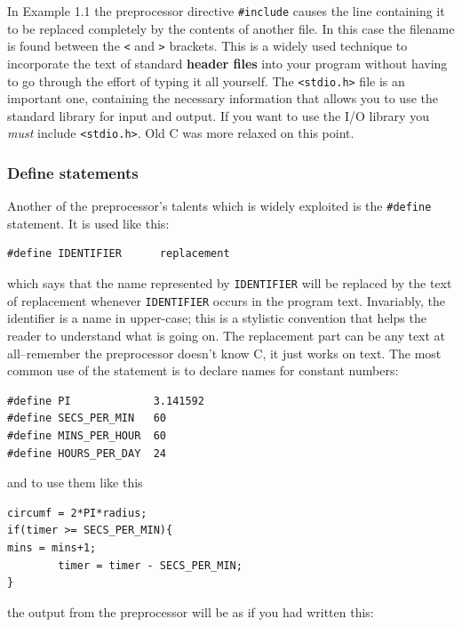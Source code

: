    In Example 1.1 the preprocessor directive
    \texttt{\#include} causes the line containing it to be replaced
    completely by the contents of another file. In this case the filename is
    found between the \texttt{<} and \texttt{>} brackets. This is
    a widely used technique to incorporate the text of standard \textbf{header
    files} into your program without having to go through the effort of
    typing it all yourself. The \texttt{<stdio.h>} file is an
    important one, containing the necessary information that allows you to use
    the standard library for input and output.  If you want to use the I/O
    library you \textit{must} include \texttt{<stdio.h>}. Old C was
    more relaxed on this point.


   \subsubsection{Define statements}
    

    Another of the preprocessor's talents which is widely exploited is the
     \texttt{\#define} statement. It is used like this:


    \begin{Verbatim}
#define IDENTIFIER      replacement
\end{Verbatim}

    which says that the name represented by \texttt{IDENTIFIER} will be
     replaced by the text of replacement whenever \texttt{IDENTIFIER}
     occurs in the program text. Invariably, the identifier is a name in
     upper-case; this is a stylistic convention that helps the reader to
     understand what is going on.  The replacement part can be any text at
     all--remember the preprocessor doesn't know C, it just works on
     text. The most common use of the statement is to declare names for
     constant numbers:


    \begin{Verbatim}
#define PI             3.141592
#define SECS_PER_MIN   60
#define MINS_PER_HOUR  60
#define HOURS_PER_DAY  24
\end{Verbatim}

    and to use them like this


    \begin{Verbatim}
circumf = 2*PI*radius;
if(timer >= SECS_PER_MIN){
mins = mins+1;
        timer = timer - SECS_PER_MIN;
}
\end{Verbatim}

    the output from the preprocessor will be as if you had written this:


